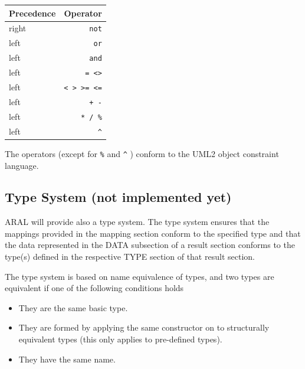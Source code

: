 \documentclass[a4paper,12pt]{report}
\newcommand{\outcomment}[1]{}
\begin{document}
\vspace{0.3cm}
\begin{tabular}{|l|r|}\hline
Precedence & Operator\\\hline\hline
right & \texttt{not}\\\hline
left & \texttt{or}\\\hline
left & \texttt{and}\\\hline
left & \texttt{= <>}\\\hline
left & \texttt{< > >= <=} \\\hline
left & \texttt{+ -}\\\hline
left & \texttt{* / \%}\\\hline
left & \texttt{\^}\\\hline
\end{tabular}

The operators (except for \texttt{\%} and \texttt{\^} ) conform to the UML2 object constraint language.

\outcomment{
{\footnotesize
\vspace{0.2cm} \textbf{Acknowledgements.} 
This work has been partially supported by the ARTIST2 Network of
Excellence 
({http://www.artist-embedded.org/}), and the research project
``Integrating European Timing Analysis Technology'' (ALL-TIMES) under
contract No 215068 funded by the 7th EU R\&D Framework Programme.
}
}

\subsection{Type System (not implemented yet)}

ARAL will provide also a type system. The type
system ensures that the mappings provided in the mapping section
conform to the specified type and that the data represented in the
DATA subsection of a result section conforms to the type(s) defined in
the respective TYPE section of that result section.

The type system is based on name equivalence of types, and two types are equivalent if one of the following conditions holds

\begin{itemize}
\item They are the same basic type.
\item They are formed by applying the same constructor on to structurally equivalent types (this only applies to pre-defined types).
\item They have the same name.
\end{itemize}
\end{document}
